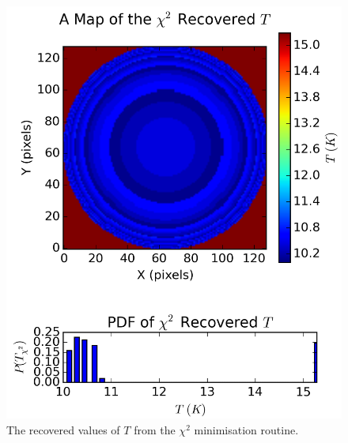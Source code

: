 \documentclass{report}
\begin{document}
\begin{figure}[H]
\begin{minipage}[b]{0.25\linewidth}
    \includegraphics[width=\linewidth]{../img/sim/map_T_chi.png}
    \caption{\protect The recovered values of $T$ from the $\chi^{2}$ minimisation routine.}\label{fig:map_T_chi}
    \vspace{4ex}
  \end{minipage}%
  \begin{minipage}[b]{0.25\linewidth}
    \centering

\end{minipage}
\end{figure}
\end{document}
